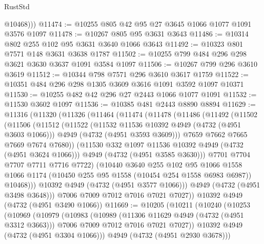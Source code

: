 \begin{lexlean}{RustStd}
\begin{coremodule}
{\begin{coremodule}
{{{{{{{{{{{{{{          @10468)))
@11474 := @10255 @805 @42 @95 @27 @3645 @1066 @1077 @1091 @3576 @1097
@11478 := @10267 @805 @95 @3631 @3643
@11486 := @10314 @802 @255 @102 @95 @3631 @3640 @1066 @3643
@11492 := @10323 @801 @7571 @148 @3631 @3638 @1787
@11502 := @10255 @799 @484 @296 @298 @3621 @3630 @3637 @1091 @3584 @1097
@11506 := @10267 @799 @296 @3610 @3619
@11512 := @10344 @798 @7571 @296 @3610 @3617 @1759
@11522 := @10351 @484 @296 @298 @1305 @3609 @3616 @1091 @3592 @1097 @10371
@11530 := @10255 @482 @42 @296 @27 @2443 @1066 @1077 @1091
@11532 := @11530 @3602 @1097
@11536 := @10385 @481 @2443 @8890 @8894
@11629 := @11316
    (@11320
      (@11326
        (@11464
          (@11474
            (@11478
              (@11486
                (@11492
                  (@11502
                    (@11506
                      (@11512
                        (@11522
                          (@11532 @11536 @10392 @4949 (@4732 (@4951 @3603 @1066)))
                          @4949
                          (@4732 (@4951 @3593 @3609)))
                        @7659
                        @7662
                        @7665
                        @7669
                        @7674
                        @7680))
                    (@11530 @332 @1097 @11536 @10392 @4949 (@4732 (@4951 @3624 @1066)))
                    @4949
                    (@4732 (@4951 @3585 @3630)))
                  @7701
                  @7704
                  @7707
                  @7711
                  @7716
                  @7722)
                (@10440
                  @3640
                  @255
                  @102
                  @95
                  @1066
                  @1558
                  @1066
                  @1174
                  (@10450 @255 @95 @1558 (@10454 @254 @1558 @6983 @6987))
                  @10468)))
            @10392
            @4949
            (@4732 (@4951 @3577 @1066)))
          @4949
          (@4732 (@4951 @3498 @3648)))
        @7006
        @7009
        @7012
        @7016
        @7021
        @7027))
    @10392
    @4949
    (@4732 (@4951 @3490 @1066))
@11669 := @10205
    (@10211
      (@10240
        (@10253
          (@10969
            (@10979
              (@10983
                (@10989
                  (@11306 @11629 @4949 (@4732 (@4951 @3312 @3663)))
                  @7006
                  @7009
                  @7012
                  @7016
                  @7021
                  @7027))
              @10392
              @4949
              (@4732 (@4951 @3304 @1066)))
            @4949
            (@4732 (@4951 @2930 @3678)))
}}}}}}}}}}}}}}
\end{coremodule}}
\end{coremodule}
\end{lexlean}
